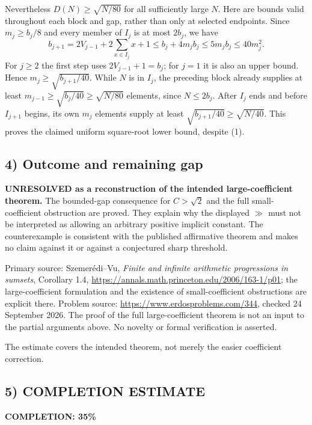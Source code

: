 Nevertheless $D(N)\ge\sqrt{N/80}$ for all sufficiently large $N$. Here are bounds valid throughout each block and gap, rather than only at selected endpoints. Since $m_j\ge b_j/8$ and every member of $I_j$ is at most $2b_j$, we have
\[b_{j+1}=2V_{j-1}+2\sum_{x\in I_j}x+1\le b_j+4m_jb_j\le5m_jb_j\le40m_j^2.
\tag{2}\]
For $j\ge2$ the first step uses $2V_{j-1}+1=b_j$; for $j=1$ it is also an upper bound. Hence $m_j\ge\sqrt{b_{j+1}/40}$. While $N$ is in $I_j$, the preceding block already supplies at least $m_{j-1}\ge\sqrt{b_j/40}\ge\sqrt{N/80}$ elements, since $N\le2b_j$. After $I_j$ ends and before $I_{j+1}$ begins, its own $m_j$ elements supply at least $\sqrt{b_{j+1}/40}\ge\sqrt{N/40}$. This proves the claimed uniform square-root lower bound, despite (1).

\subsection*{4) Outcome and remaining gap}
\textbf{UNRESOLVED as a reconstruction of the intended large-coefficient theorem.} The bounded-gap consequence for $C>\sqrt2$ and the full small-coefficient obstruction are proved. They explain why the displayed $\gg$ must not be interpreted as allowing an arbitrary positive implicit constant. The counterexample is consistent with the published affirmative theorem and makes no claim against it or against a conjectured sharp threshold.

Primary source: Szemer\'edi--Vu, \emph{Finite and infinite arithmetic progressions in sumsets}, Corollary 1.4, \url{https://annals.math.princeton.edu/2006/163-1/p01}; the large-coefficient formulation and the existence of small-coefficient obstructions are explicit there. Problem source: \url{https://www.erdosproblems.com/344}, checked 24 September 2026. The proof of the full large-coefficient theorem is not an input to the partial arguments above. No novelty or formal verification is asserted.

The estimate covers the intended theorem, not merely the easier coefficient correction.
\subsection*{5) COMPLETION ESTIMATE}
\textbf{COMPLETION: 35\%}
